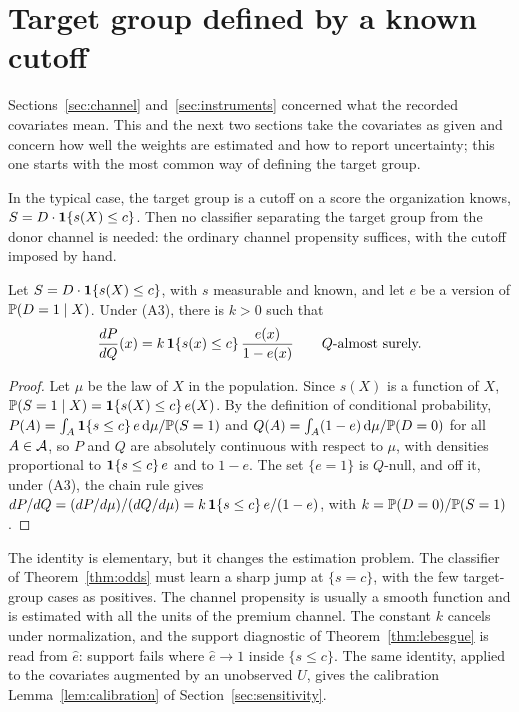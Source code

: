 \section{Target group defined by a known cutoff}\label{sec:cutoff}

Sections~\ref{sec:channel} and~\ref{sec:instruments} concerned what the recorded covariates mean. This and the next two sections take the covariates as given and concern how well the weights are estimated and how to report uncertainty; this one starts with the most common way of defining the target group.

In the typical case, the target group is a cutoff on a score the organization knows, $S=D\cdot\mathbf{1}\{s(X)\le c\}$. Then no classifier separating the target group from the donor channel is needed: the ordinary channel propensity suffices, with the cutoff imposed by hand.

\begin{proposition}\label{prop:cutoff}
Let $S=D\cdot\mathbf{1}\{s(X)\le c\}$, with $s$ measurable and known, and let $e$ be a version of $\mathbb{P}(D=1\mid X)$. Under (A3), there is $k>0$ such that
\[
\frac{dP}{dQ}(x)=k\,\mathbf{1}\{s(x)\le c\}\,\frac{e(x)}{1-e(x)}\qquad Q\text{-almost surely.}
\]
\end{proposition}
\begin{proof}
Let $\mu$ be the law of $X$ in the population. Since $s(X)$ is a function of $X$, $\mathbb{P}(S=1\mid X)=\mathbf{1}\{s(X)\le c\}\,e(X)$. By the definition of conditional probability, $P(A)=\int_A\mathbf{1}\{s\le c\}\,e\,\mathrm{d}\mu/\mathbb{P}(S=1)$ and $Q(A)=\int_A(1-e)\,\mathrm{d}\mu/\mathbb{P}(D=0)$ for all $A\in\mathcal{A}$, so $P$ and $Q$ are absolutely continuous with respect to $\mu$, with densities proportional to $\mathbf{1}\{s\le c\}\,e$ and to $1-e$. The set $\{e=1\}$ is $Q$-null, and off it, under (A3), the chain rule gives $dP/dQ=(dP/d\mu)/(dQ/d\mu)=k\,\mathbf{1}\{s\le c\}\,e/(1-e)$, with $k=\mathbb{P}(D=0)/\mathbb{P}(S=1)$.
\end{proof}

The identity is elementary, but it changes the estimation problem. The classifier of Theorem~\ref{thm:odds} must learn a sharp jump at $\{s=c\}$, with the few target-group cases as positives. The channel propensity is usually a smooth function and is estimated with all the units of the premium channel. The constant $k$ cancels under normalization, and the support diagnostic of Theorem~\ref{thm:lebesgue} is read from $\hat e$: support fails where $\hat e\to1$ inside $\{s\le c\}$. The same identity, applied to the covariates augmented by an unobserved $U$, gives the calibration Lemma~\ref{lem:calibration} of Section~\ref{sec:sensitivity}.

